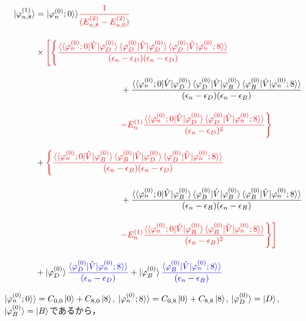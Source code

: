 \begin{align}
    \ket{\varphi_{n,8}^{(1)}}
    &=
    |\varphi^{(0)}_n;0\rangle\rangle
    \textcolor{red}{\frac{1}{(E^{(2)}_{n,8}-E^{(2)}_{n,0})}}\nn[10pt]
    &\times
    \textcolor{red}{\Biggl[\Biggl\{
    \frac{\langle\braket{\varphi^{(0)}_{n};0|\hat{V}|\varphi^{(0)}_D}
    \langle{\varphi^{(0)}_{D}|\hat{V}|\varphi^{(0)}_D}\rangle
    \braket{\varphi^{(0)}_{D}|\hat{V}|\varphi^{(0)}_n;8}\rangle}
    {(\epsilon_n-\epsilon_D)(\epsilon_n-\epsilon_D)}}\nn[10pt]
    &\hspace{100pt}
    +{\frac{\langle\braket{\varphi^{(0)}_{n};0|\hat{V}|\varphi^{(0)}_D}
    \langle{\varphi^{(0)}_{D}|\hat{V}|\varphi^{(0)}_B}\rangle
    \braket{\varphi^{(0)}_{B}|\hat{V}|\varphi^{(0)}_n;8}\rangle}
    {(\epsilon_n-\epsilon_D)(\epsilon_n-\epsilon_B)}}\nn[10pt]
    &\hspace{100pt}
    \textcolor{red}{-E^{(1)}_n
    \frac{\langle\braket{\varphi^{(0)}_{n};0|\hat{V}|\varphi^{(0)}_D}
    \braket{\varphi^{(0)}_{D}|\hat{V}|\varphi^{(0)}_n;8}\rangle}{(\epsilon_n-\epsilon_D)^2}
    \Biggr\}}
    \nn[10pt]
    &+\textcolor{red}{\Biggl\{
    \frac{\langle\braket{\varphi^{(0)}_{n};0|\hat{V}|\varphi^{(0)}_B}
    \langle{\varphi^{(0)}_{B}|\hat{V}|\varphi^{(0)}_D}\rangle
    \braket{\varphi^{(0)}_{D}|\hat{V}|\varphi^{(0)}_n;8}\rangle}
    {(\epsilon_n-\epsilon_B)(\epsilon_n-\epsilon_D)}}\nn[10pt]
    &\hspace{100pt}
    +{\frac{\langle\braket{\varphi^{(0)}_{n};0|\hat{V}|\varphi^{(0)}_B}
    \langle{\varphi^{(0)}_{B}|\hat{V}|\varphi^{(0)}_B}\rangle
    \braket{\varphi^{(0)}_{B}|\hat{V}|\varphi^{(0)}_n;8}\rangle}
    {(\epsilon_n-\epsilon_B)(\epsilon_n-\epsilon_B)}}\nn[10pt]
    &\hspace{100pt}
    \textcolor{red}{-E^{(1)}_n
    \frac{\langle\braket{\varphi^{(0)}_{n};0|\hat{V}|\varphi^{(0)}_B}
    \braket{\varphi^{(0)}_{B}|\hat{V}|\varphi^{(0)}_n;8}\rangle}{(\epsilon_n-\epsilon_B)^2}
    \Biggr\}\Biggr]}
    \nn[10pt]
    &+
    \ket{\varphi^{(0)}_D}
    \textcolor{blue}{
    \frac{\braket{\varphi^{(0)}_{D}|\hat{V}|\varphi^{(0)}_n;8}\rangle}{(\epsilon_n-\epsilon_D)}}
    +
    \ket{\varphi^{(0)}_B}
    \textcolor{blue}{
    \frac{\braket{\varphi^{(0)}_{B}|\hat{V}|\varphi^{(0)}_n;8}\rangle}{(\epsilon_n-\epsilon_B)}}
\end{align}

$|\varphi^{(0)}_{n};0\rangle\rangle=C_{0,0}\ket{0}+C_{8,0}\ket{8}$, 
$|\varphi^{(0)}_{n};8\rangle\rangle=C_{0,8}\ket{0}+C_{8,8}\ket{8}$,  $|\varphi^{(0)}_{D}\rangle=\ket{D}$, $|\varphi^{(0)}_{B}\rangle=\ket{B}$であるから，


